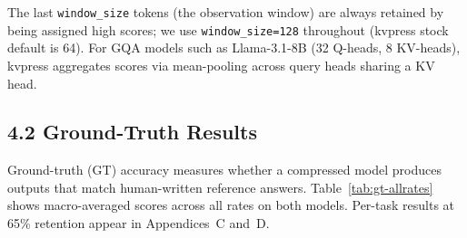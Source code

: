 \documentclass[10pt,letterpaper]{article}
\begin{document}
The last \texttt{window\_size} tokens (the observation window) are
always retained by being assigned high scores; we use
\texttt{window\_size=128} throughout (kvpress stock default is 64). For
GQA models such as Llama-3.1-8B (32 Q-heads, 8 KV-heads), kvpress
aggregates scores via mean-pooling across query heads sharing a KV head.

\hypertarget{gt-evaluation}{%
\subsection{4.2 Ground-Truth Results}\label{gt-evaluation}}

Ground-truth (GT) accuracy measures whether a compressed model produces outputs
that match human-written reference answers. Table~\ref{tab:gt-allrates} shows macro-averaged scores
across all rates on both models.
Per-task results at 65\% retention appear in Appendices~C and~D.
\end{document}
